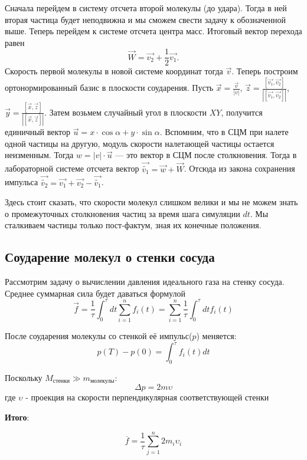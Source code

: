 \documentclass[twoside,twocolumn, 11pt]{article}
\theoremstyle{plain}
\theoremstyle{definition}
\begin{document}
Сначала перейдем в систему отсчета второй молекулы (до удара). Тогда в ней вторая частица будет неподвижна и мы сможем свести задачу к обозначенной выше. Теперь перейдем к системе отсчета центра масс. Итоговый вектор перехода равен
\begin{equation}
\vec{W} = \vec{v_2} + \frac{1}{2}\vec{v_1}.
\end{equation}
\indent Скорость первой молекулы в новой системе координат тогда $\vec{v}$.
Теперь построим ортонормированный базис в плоскости соударения. Пусть $\vec{x} = \frac{\vec{v}}{|v|}$, $\vec{z} = \frac{[\vec{v_1}, \vec{v_2}]}{|[\vec{v_1}, \vec{v_2}]|}$, $\vec{y} = \frac{[\vec{x}, \vec{z}]}{|[\vec{x}, \vec{z}]|}$. Затем возьмем случайный угол в плоскости $XY$, получится единичный вектор $\overrightarrow{u} = x \cdot \cos \alpha + y \cdot \sin \alpha$. Вспомним, что в СЦМ при налете одной частицы на другую, модуль скорости налетающей частицы остается неизменным. Тогда $w = |v| \cdot \overrightarrow{u}$ — это вектор в СЦМ после столкновения. Тогда в лабораторной системе отсчета вектор $\overrightarrow{\widetilde{v_1}} = \overrightarrow{w} + \overrightarrow{W}$. Отсюда из закона сохранения импульса $\overrightarrow{\widetilde{v_2}} = \overrightarrow{v_1} + \overrightarrow{v_2} - \overrightarrow{\widetilde{v_1}}$.

Здесь стоит сказать, что скорости молекул слишком велики и мы не можем знать о промежуточных столкновения частиц за время шага симуляции $dt$. Мы сталкиваем частицы только пост-фактум, зная их конечные положения.
\subsection{Соударение молекул о стенки сосуда}
Рассмотрим задачу о вычислении давления идеального газа на стенку сосуда. Среднее суммарная сила будет даваться формулой
\begin{equation}
\vec{f} = \dfrac{1}{\tau} \int_0^\tau dt \sum_{i=1}^n f_i(t) = \sum_{i=1}^n \dfrac{1}{\tau} \int_0^\tau dt f_i(t)
\end{equation}

После соударения молекулы со стенкой её импульс($p$) меняется:
\[p(T) - p(0) = \int_0^\tau f_i(t) dt \]

Поскольку $M_\text{стенки} \gg m_\text{молекулы}$:
\[\Delta p = 2m\upsilon \]где $\upsilon$ - проекция на скорости перпендикулярная соответствующей стенки

\textbf{Итого}:

\begin{equation}
\overline{f} = \dfrac{1}{\tau} \sum_{j=1}^n 2 m_i \upsilon_i
\end{equation}
\end{document}
